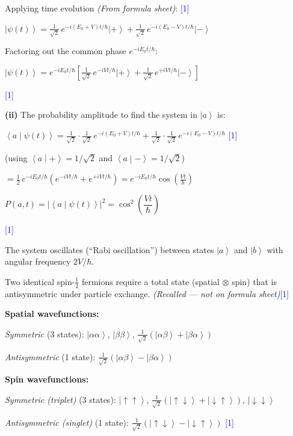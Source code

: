 \documentclass[12pt,a4paper]{article}
\newcommand{\markstep}[1]{\hfill\textcolor{blue}{[#1]}}
\newcommand{\finalanswer}[1]{%
  \begin{tcolorbox}[colback=green!5!white,colframe=green!50!black,boxrule=0.5pt]
  #1
  \end{tcolorbox}
}
\newcommand{\fromsheet}{\textit{(From formula sheet)}}
\newcommand{\recalled}{\textit{(Recalled --- not on formula sheet)}}
\renewcommand{\ket}[1]{\left|#1\right\rangle}
\renewcommand{\braket}[2]{\left\langle #1\middle|#2\right\rangle}
\begin{document}
\begin{parts}
Applying time evolution \fromsheet: \markstep{1}

$\ket{\psi(t)} = \frac{1}{\sqrt{2}}\,e^{-i(E_0+V)t/\hbar}\ket{+} + \frac{1}{\sqrt{2}}\,e^{-i(E_0-V)t/\hbar}\ket{-}$

Factoring out the common phase $e^{-iE_0 t/\hbar}$:

\finalanswer{$\ket{\psi(t)} = e^{-iE_0 t/\hbar}\!\left[\frac{1}{\sqrt{2}}\,e^{-iVt/\hbar}\ket{+} + \frac{1}{\sqrt{2}}\,e^{+iVt/\hbar}\ket{-}\right]$} \markstep{1}

\textbf{(ii)} The probability amplitude to find the system in $\ket{a}$ is:

$\braket{a}{\psi(t)} = \frac{1}{\sqrt{2}}\cdot\frac{1}{\sqrt{2}}\,e^{-i(E_0+V)t/\hbar} + \frac{1}{\sqrt{2}}\cdot\frac{1}{\sqrt{2}}\,e^{-i(E_0-V)t/\hbar}$ \markstep{1}

(using $\braket{a}{+} = 1/\sqrt{2}$ and $\braket{a}{-} = 1/\sqrt{2}$)

$= \frac{1}{2}\,e^{-iE_0 t/\hbar}\!\left(e^{-iVt/\hbar} + e^{+iVt/\hbar}\right) = e^{-iE_0 t/\hbar}\cos\!\left(\frac{Vt}{\hbar}\right)$

\finalanswer{$P(a,t) = \left|\braket{a}{\psi(t)}\right|^2 = \cos^2\!\left(\dfrac{Vt}{\hbar}\right)$} \markstep{1}

The system oscillates (``Rabi oscillation'') between states $\ket{a}$ and $\ket{b}$ with angular frequency $2V/\hbar$.

\item

Two identical spin-$\frac{1}{2}$ fermions require a total state (spatial $\otimes$ spin) that is antisymmetric under particle exchange. \recalled \markstep{1}

\textbf{Spatial wavefunctions:}

\emph{Symmetric} (3 states):
$\ket{\alpha\alpha}$, \quad $\ket{\beta\beta}$, \quad $\frac{1}{\sqrt{2}}(\ket{\alpha\beta} + \ket{\beta\alpha})$

\emph{Antisymmetric} (1 state):
$\frac{1}{\sqrt{2}}(\ket{\alpha\beta} - \ket{\beta\alpha})$

\textbf{Spin wavefunctions:}

\emph{Symmetric (triplet)} (3 states):
$\ket{\!\uparrow\uparrow}$, \quad $\frac{1}{\sqrt{2}}(\ket{\!\uparrow\downarrow} + \ket{\!\downarrow\uparrow})$, \quad $\ket{\!\downarrow\downarrow}$

\emph{Antisymmetric (singlet)} (1 state):
$\frac{1}{\sqrt{2}}(\ket{\!\uparrow\downarrow} - \ket{\!\downarrow\uparrow})$ \markstep{1}


\end{parts}
\end{document}

